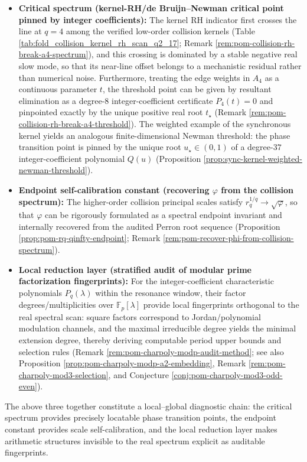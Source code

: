 \begin{itemize}
  \item \textbf{Critical spectrum (kernel-RH/de Bruijn--Newman critical point pinned by integer coefficients):}
  The kernel RH indicator first crosses the line at \(q=4\) among the verified low-order collision kernels (Table \ref{tab:fold_collision_kernel_rh_scan_q2_17}; Remark \ref{rem:pom-collision-rh-break-a4-spectrum}), and this crossing is dominated by a stable negative real slow mode, so that its near-line offset belongs to a mechanistic residual rather than numerical noise.
  Furthermore, treating the edge weights in \(A_4\) as a continuous parameter \(t\), the threshold point can be given by resultant elimination as a degree-8 integer-coefficient certificate \(P_4(t)=0\) and pinpointed exactly by the unique positive real root \(t_\star\) (Remark \ref{rem:pom-collision-rh-break-a4-threshold}).
  The weighted example of the synchronous kernel yields an analogous finite-dimensional Newman threshold: the phase transition point is pinned by the unique root \(u_\star\in(0,1)\) of a degree-\(37\) integer-coefficient polynomial \(Q(u)\) (Proposition \ref{prop:sync-kernel-weighted-newman-threshold}).
  \item \textbf{Endpoint self-calibration constant (recovering \texorpdfstring{$\varphi$}{phi} from the collision spectrum):}
  The higher-order collision principal scales satisfy \(r_q^{1/q}\to\sqrt{\varphi}\), so that \(\varphi\) can be rigorously formulated as a spectral endpoint invariant and internally recovered from the audited Perron root sequence (Proposition \ref{prop:pom-rq-qinfty-endpoint}; Remark \ref{rem:pom-recover-phi-from-collision-spectrum}).
  \item \textbf{Local reduction layer (stratified audit of modular prime factorization fingerprints):}
  For the integer-coefficient characteristic polynomials \(P_q(\lambda)\) within the resonance window, their factor degrees/multiplicities over \(\mathbb{F}_p[\lambda]\) provide local fingerprints orthogonal to the real spectral scan: square factors correspond to Jordan/polynomial modulation channels, and the maximal irreducible degree yields the minimal extension degree, thereby deriving computable period upper bounds and selection rules (Remark \ref{rem:pom-charpoly-modp-audit-method}; see also Proposition \ref{prop:pom-charpoly-modp-a2-embedding}, Remark \ref{rem:pom-charpoly-mod3-selection}, and Conjecture \ref{conj:pom-charpoly-mod3-odd-even}).
\end{itemize}
The above three together constitute a local--global diagnostic chain: the critical spectrum provides precisely locatable phase transition points, the endpoint constant provides scale self-calibration, and the local reduction layer makes arithmetic structures invisible to the real spectrum explicit as auditable fingerprints.
